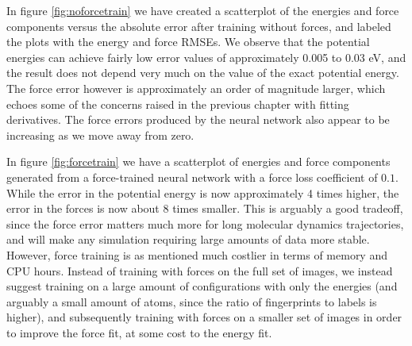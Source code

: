 In figure \ref{fig:noforcetrain} we have created a scatterplot
of the energies and force components versus 
the absolute error after training without
forces, and labeled the plots with the energy and force RMSEs.
We observe that the potential energies can achieve fairly
low error values of approximately 0.005 to 0.03 eV, and the
result does not depend very much on the value of the exact potential
energy.
The force error however is approximately an order of magnitude
larger, which echoes some of the concerns raised in the previous
chapter with fitting derivatives. The force errors produced by the neural
network also appear to be increasing as we move away from zero.
\par
In figure \ref{fig:forcetrain} we have a scatterplot of energies
and force components generated from a force-trained neural network
with a force loss coefficient of $0.1$.
While the error in the potential energy is now approximately 4 times higher,
the error in the forces is now about 8 times smaller.
This is arguably a good tradeoff, since the force error matters
much more for long molecular dynamics trajectories, and will make
any simulation requiring large amounts of data more stable.
However, force training is as mentioned much costlier in terms
of memory and CPU hours. Instead of training with forces on the full
set of images, we instead suggest training on a large amount of configurations
with only the energies (and arguably a small amount of atoms, since
the ratio of fingerprints to labels is higher), and subsequently training
with forces on a smaller set of images in order to improve the force fit,
at some cost to the energy fit.


